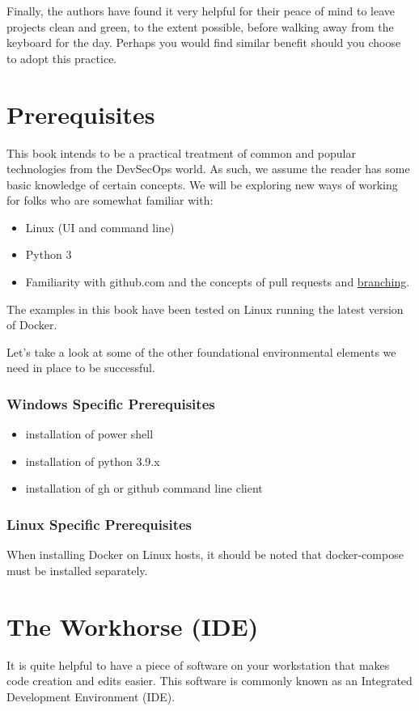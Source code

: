 \justify
Finally, the authors have found it very helpful for their peace of mind
to leave projects clean and green, to the extent possible, before walking away from the keyboard for the day. Perhaps you would find similar benefit should you choose to adopt this practice.

\section{Prerequisites}

\justify
This book intends to be a practical treatment of common and popular
technologies from the DevSecOps world. As such, we assume the reader has
some basic knowledge of certain concepts. We will be exploring new ways
of working for folks who are somewhat familiar with:

\begin{itemize}
\item
  Linux (UI and command line)
\item Python 3
\item
  Familiarity with github.com and the concepts of {pull requests} and \href{}{branching}.
\end{itemize}

\justify
The examples in this book have been tested on Linux running the latest
version of Docker.

\justify
Let's take a look at some of the other foundational environmental
elements we need in place to be successful.

\subsubsection{Windows Specific Prerequisites}

\begin{itemize}
\item installation of power shell
\item installation of python 3.9.x
\item installation of gh or github command line client
\end{itemize}

\subsubsection{Linux Specific Prerequisites}
\justify
When installing Docker on Linux hosts, it should be noted that docker-compose must be installed separately.

\section{The Workhorse (IDE)}
\justify
It is quite helpful to have a piece of software on your workstation that
makes code creation and edits easier. This software is commonly known as
an Integrated Development Environment (IDE).

